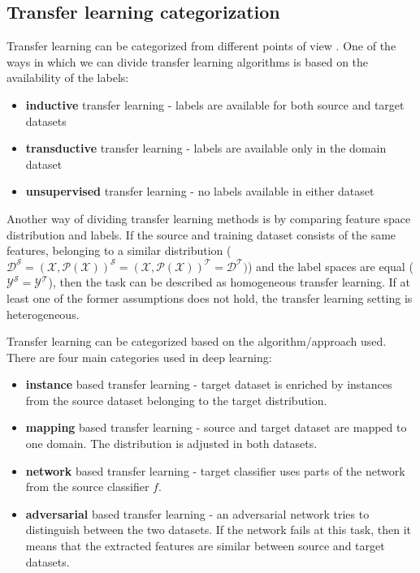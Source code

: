 \documentclass[a4paper,11pt,twoside]{report}
\theoremstyle{definition}
\begin{document}
\subsection{Transfer learning categorization}
Transfer learning can be categorized from different points of view \cite{comp_survey_transfer_leaerning}. One of the ways in which we can divide transfer learning algorithms is based on the availability of the labels:
\begin{itemize}
\item \textbf{inductive} transfer learning - labels are available for both source and target datasets
\item \textbf{transductive} transfer learning - labels are available only in the domain dataset
\item \textbf{unsupervised} transfer learning - no labels available in either dataset
\end{itemize}
Another way of dividing transfer learning methods is by comparing feature space distribution and labels. If the source and training dataset consists of the same features, belonging to a similar distribution ($\mathcal{D^S} = \mathcal{(X, P(X))^S} = \mathcal{(X, P(X))^T} = \mathcal{D^T})$) and the label spaces are equal ($\mathcal{Y^S} = \mathcal{Y^T} $), then the task can be described as homogeneous transfer learning. If at least one of the former assumptions does not hold, the transfer learning setting is heterogeneous.

Transfer learning can be categorized based on the algorithm/approach used. There are four main categories \cite{deep_tranfer_learning} used in deep learning:
\begin{itemize}
	\item \textbf{instance} based transfer learning - target dataset is enriched by instances from the source dataset belonging to the target distribution.
	\item \textbf{mapping} based transfer learning - source and target dataset are mapped to one domain. The distribution is adjusted in both datasets.
	\item \textbf{network} based transfer learning - target classifier uses parts of the network from the source classifier $f$.
	\item \textbf{adversarial} based transfer learning - an adversarial network tries to distinguish between the two datasets. If the network fails at this task, then it means that the extracted features are similar between source and target datasets.
\end{itemize}
\end{document}
